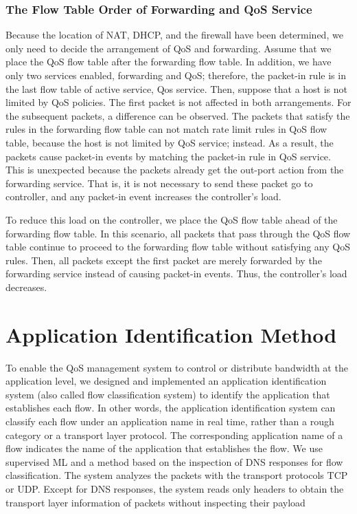 \documentclass[journal]{IEEEtran}
\begin{document}
\subsubsection{The Flow Table Order of Forwarding and QoS Service}
Because the location of NAT, DHCP, and the firewall have been determined, we only need to decide the arrangement of QoS and forwarding. Assume that we place the QoS flow table after the forwarding flow table. In addition, we have only two services enabled, forwarding and QoS; therefore, the packet-in rule is in the last flow table of active service, Qos service. Then, suppose that a host is not limited by QoS policies. The first packet is not affected in both arrangements. For the subsequent packets, a difference can be observed. The packets that satisfy the rules in the forwarding flow table can not match rate limit rules in QoS flow table, because the host is not limited by QoS service; instead. As a result, the packets cause packet-in events by matching the packet-in rule in QoS service. This is unexpected because the packets already get the out-port action from the forwarding service. That is, it is not necessary to send these packet go to controller, and any packet-in event increases the controller’s load.

To reduce this load on the controller, we place the QoS flow table ahead of the forwarding flow table. In this scenario, all packets that pass through the QoS flow table continue to proceed to the forwarding flow table without satisfying any QoS rules. Then, all packets except the first packet are merely forwarded by the forwarding service instead of causing packet-in events. Thus, the controller’s load decreases.



\section{Application Identification Method}\label{sec:app_identification}
To enable the QoS management system to control or distribute bandwidth at the application level, we designed and implemented an application identification system (also called flow classification system) to identify the application that establishes each flow. In other words, the application identification system can classify each flow under an application name in real time, rather than a rough category or a transport layer protocol. The corresponding application name of a flow indicates the name of the application that establishes the flow. We use supervised ML and a method based on the inspection of DNS responses for flow classification. The system analyzes the packets with the transport protocols TCP or UDP. Except for DNS responses, the system reads only headers to obtain the transport layer information of packets without inspecting their payload
\end{document}
